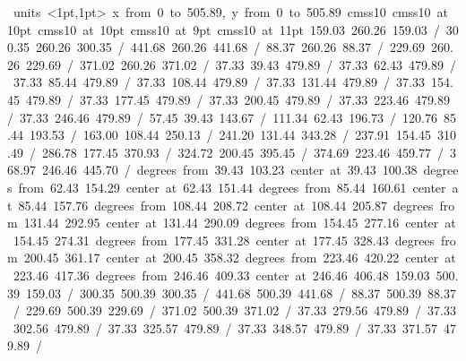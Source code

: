 \hbox{\beginpicture
\setcoordinatesystem units <1pt,1pt>
\setplotarea x from 0 to 505.89, y from 0 to 505.89
\setlinear
\font\picfont cmss10\picfont
\font\picfont cmss10 at 10pt\picfont
\font\picfont cmss10 at 10pt\picfont
\font\picfont cmss10 at 9pt\picfont
\font\picfont cmss10 at 11pt\picfont
\setsolid
{} 159.03 260.26 159.03 /
\setsolid
{} 300.35 260.26 300.35 /
\setsolid
{} 441.68 260.26 441.68 /
\setsolid
{} 88.37 260.26 88.37 /
\setsolid
{} 229.69 260.26 229.69 /
\setsolid
{} 371.02 260.26 371.02 /
\setsolid
{} 37.33 39.43 479.89 /
\setsolid
{} 37.33 62.43 479.89 /
\setsolid
{} 37.33 85.44 479.89 /
\setsolid
{} 37.33 108.44 479.89 /
\setsolid
{} 37.33 131.44 479.89 /
\setsolid
{} 37.33 154.45 479.89 /
\setsolid
{} 37.33 177.45 479.89 /
\setsolid
{} 37.33 200.45 479.89 /
\setsolid
{} 37.33 223.46 479.89 /
\setsolid
{} 37.33 246.46 479.89 /
\setsolid
{} 57.45 39.43 143.67 /
\setsolid
{} 111.34 62.43 196.73 /
\setsolid
{} 120.76 85.44 193.53 /
\setsolid
{} 163.00 108.44 250.13 /
\setsolid
{} 241.20 131.44 343.28 /
\setsolid
{} 237.91 154.45 310.49 /
\setsolid
{} 286.78 177.45 370.93 /
\setsolid
{} 324.72 200.45 395.45 /
\setsolid
{} 374.69 223.46 459.77 /
\setsolid
{} 368.97 246.46 445.70 /
 degrees from 39.43 103.23 center at 39.43 100.38
 degrees from 62.43 154.29 center at 62.43 151.44
 degrees from 85.44 160.61 center at 85.44 157.76
 degrees from 108.44 208.72 center at 108.44 205.87
 degrees from 131.44 292.95 center at 131.44 290.09
 degrees from 154.45 277.16 center at 154.45 274.31
 degrees from 177.45 331.28 center at 177.45 328.43
 degrees from 200.45 361.17 center at 200.45 358.32
 degrees from 223.46 420.22 center at 223.46 417.36
 degrees from 246.46 409.33 center at 246.46 406.48
\setsolid
{} 159.03 500.39 159.03 /
\setsolid
{} 300.35 500.39 300.35 /
\setsolid
{} 441.68 500.39 441.68 /
\setsolid
{} 88.37 500.39 88.37 /
\setsolid
{} 229.69 500.39 229.69 /
\setsolid
{} 371.02 500.39 371.02 /
\setsolid
{} 37.33 279.56 479.89 /
\setsolid
{} 37.33 302.56 479.89 /
\setsolid
{} 37.33 325.57 479.89 /
\setsolid
{} 37.33 348.57 479.89 /
\setsolid
{} 37.33 371.57 479.89 /
}
